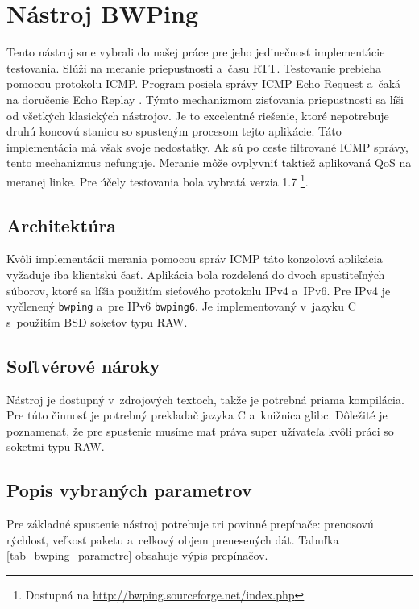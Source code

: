     \section{Nástroj BWPing}
        Tento nástroj sme vybrali do našej práce pre jeho jedinečnosť
        implementácie testovania. Slúži na meranie priepustnosti 
        a~času RTT. Testovanie prebieha pomocou protokolu ICMP. Program posiela
        správy ICMP Echo Request a~čaká na doručenie Echo Replay
        \cite{bwping_home}. Týmto
        mechanizmom zisťovania priepustnosti sa líši od všetkých klasických
        nástrojov. Je to excelentné riešenie, ktoré nepotrebuje druhú koncovú
        stanicu so spusteným procesom tejto aplikácie.
        Táto implementácia má však svoje nedostatky. Ak sú po ceste filtrované ICMP
        správy, tento mechanizmus nefunguje. Meranie môže ovplyvniť taktiež
        aplikovaná QoS na meranej linke.
        Pre účely testovania bola vybratá verzia 1.7
        \footnote{Dostupná na \url{http://bwping.sourceforge.net/index.php}}.

        \subsection{Architektúra}\label{bwping_arch}
        Kvôli implementácii merania pomocou správ ICMP táto konzolová aplikácia 
        vyžaduje iba klientskú časť. Aplikácia bola rozdelená do dvoch
        spustiteľných súborov, ktoré sa líšia použitím sieťového protokolu IPv4
        a~IPv6. Pre IPv4 je vyčlenený \texttt{bwping} a~pre IPv6
        \texttt{bwping6}. Je implementovaný v~jazyku C s~použitím BSD soketov
        typu RAW.

        \subsection{Softvérové nároky} \label{bwping_sw}
        Nástroj je dostupný v~zdrojových textoch, takže je potrebná priama 
        kompilácia. Pre túto činnosť je potrebný prekladač jazyka C a~knižnica
        glibc. Dôležité je poznamenať, že pre spustenie musíme mať práva super
        užívateľa kvôli práci so soketmi typu RAW. 

\newpage

        \subsection{Popis vybraných parametrov} \label{bwping_param}
        Pre základné spustenie nástroj potrebuje tri povinné prepínače: prenosovú
        rýchlosť, veľkosť paketu a~celkový objem prenesených dát. Tabuľka 
        \ref{tab_bwping_parametre} obsahuje výpis prepínačov.

